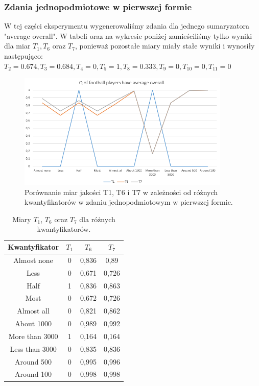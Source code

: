 \documentclass{classrep}
\begin{document}
	\subsubsection{Zdania jednopodmiotowe w pierwszej formie}
	W tej części eksperymentu wygenerowaliśmy zdania dla jednego sumaryzatora "average overall".
	W tabeli oraz na wykresie poniżej zamieściliśmy tylko wyniki dla miar $T_1, T_6$ oraz $T_7$, ponieważ pozostałe miary miały stałe wyniki i wynosiły następująco: $T_2 = 0.674, T_3 = 0.684, T_4 = 0, T_5 = 1, T_8 = 0.333, T_9 = 0, T_{10} = 0, T_{11} = 0 $
	
	\begin{figure}[h!]
		\centering
		\includegraphics[width=0.9\textwidth]{ex/1.png}
		\caption{Porównanie miar jakości T1, T6 i T7 w zależności od różnych kwantyfikatorów w zdaniu jednopodmiotowym w pierwszej formie.}
		\label{wykresex1a}
	\end{figure}
\begin{table}[h!]
	\centering
	\begin{tabular} {c c c c}
		\hline
		\textbf{Kwantyfikator} & \textbf{$T_1$} & \textbf{$T_6$} & \textbf{$T_7$} \\ [0.5ex] 
		\hline	
		\hline 
		Almost none	& 0 &	0,836 &	0,89 \\
		Less	& 0	& 0,671	& 0,726 \\
		Half	& 1 &	0,836	& 0,863 \\
		Most	& 0 &	0,672	& 0,726 \\ 
		Almost all &	0&	0,821	& 0,862 \\ 
		About 1000	& 0 &	0,989	& 0,992 \\ 
		More than 3000	& 1 &	0,164 &	0,164 \\ 
		Less than 3000	& 0 &	0,835 &	0,836 \\ 
		Around 500	& 0 &	0,995	& 0,996 \\ 
		Around 100	& 0 &	0,998	& 0,998	\\ 					
		\hline			
	\end{tabular}
	\caption{Miary $T_1$, $T_6$ oraz $T_7$ dla różnych kwantyfikatorów. }
	\label{tabelaex1}
\end{table}
	\newpage
\end{document}
